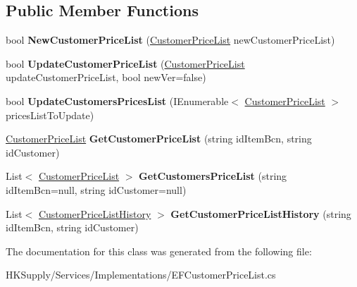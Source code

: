 \subsection*{Public Member Functions}
\begin{DoxyCompactItemize}
\item 
\mbox{\label{class_h_k_supply_1_1_services_1_1_implementations_1_1_e_f_customer_price_list_a6fd8de1f0b5de2c06272d336b61491ea}} 
bool {\bfseries New\+Customer\+Price\+List} (\mbox{\hyperlink{class_h_k_supply_1_1_models_1_1_customer_price_list}{Customer\+Price\+List}} new\+Customer\+Price\+List)
\item 
\mbox{\label{class_h_k_supply_1_1_services_1_1_implementations_1_1_e_f_customer_price_list_af9739836c9d89438515569574ea5bfc7}} 
bool {\bfseries Update\+Customer\+Price\+List} (\mbox{\hyperlink{class_h_k_supply_1_1_models_1_1_customer_price_list}{Customer\+Price\+List}} update\+Customer\+Price\+List, bool new\+Ver=false)
\item 
\mbox{\label{class_h_k_supply_1_1_services_1_1_implementations_1_1_e_f_customer_price_list_a6e1450708f6e20c0ec943734d066a06d}} 
bool {\bfseries Update\+Customers\+Prices\+List} (I\+Enumerable$<$ \mbox{\hyperlink{class_h_k_supply_1_1_models_1_1_customer_price_list}{Customer\+Price\+List}} $>$ prices\+List\+To\+Update)
\item 
\mbox{\label{class_h_k_supply_1_1_services_1_1_implementations_1_1_e_f_customer_price_list_a5f6b7a05f17a57c41c5db1fa3352d728}} 
\mbox{\hyperlink{class_h_k_supply_1_1_models_1_1_customer_price_list}{Customer\+Price\+List}} {\bfseries Get\+Customer\+Price\+List} (string id\+Item\+Bcn, string id\+Customer)
\item 
\mbox{\label{class_h_k_supply_1_1_services_1_1_implementations_1_1_e_f_customer_price_list_a9961acfeff2d8645b4136b806207f7c5}} 
List$<$ \mbox{\hyperlink{class_h_k_supply_1_1_models_1_1_customer_price_list}{Customer\+Price\+List}} $>$ {\bfseries Get\+Customers\+Price\+List} (string id\+Item\+Bcn=null, string id\+Customer=null)
\item 
\mbox{\label{class_h_k_supply_1_1_services_1_1_implementations_1_1_e_f_customer_price_list_ac946aa65cb30e40586122049a48293c7}} 
List$<$ \mbox{\hyperlink{class_h_k_supply_1_1_models_1_1_customer_price_list_history}{Customer\+Price\+List\+History}} $>$ {\bfseries Get\+Customer\+Price\+List\+History} (string id\+Item\+Bcn, string id\+Customer)
\end{DoxyCompactItemize}


The documentation for this class was generated from the following file\+:\begin{DoxyCompactItemize}
\item 
H\+K\+Supply/\+Services/\+Implementations/E\+F\+Customer\+Price\+List.\+cs\end{DoxyCompactItemize}
